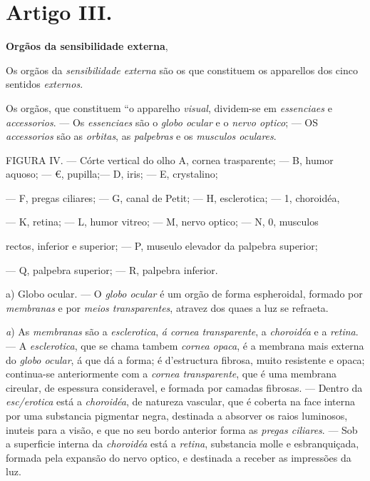 
\section*{Artigo III.}

\textbf{Orgãos da sensibilidade externa},


Os orgãos da \emph{sensibilidade externa} são os que constituem os apparellos dos cinco sentidos \emph{externos}.


 
Os orgãos, que constituem “o apparelho \emph{visual}, dividem-se em \emph{essenciaes} e \emph{accessorios}. --- Os \emph{essenciaes} são o \emph{globo ocular} e o \emph{nervo optico}; --- OS \emph{accessorios} são as \emph{orbitas}, as \emph{palpebras} e os \emph{musculos oculares}.

FIGURA IV. --- Córte vertical do olho A, cornea trasparente; --- B, humor aquoso; --- €, pupilla;--- D, iris; --- E, crystalino;

--- F, pregas ciliares; --- G, canal de Petit; --- H, esclerotica; --- 1, choroidéa,

--- K, retina; --- L, humor vitreo; --- M, nervo optico; --- N, 0, musculos

rectos, inferior e superior; --- P, museulo elevador da palpebra superior;

--- Q, palpebra superior; --- R, palpebra inferior.

a) Globo ocular. --- O \emph{globo ocular} é um orgão de forma espheroidal, formado por \emph{membranas} e por \emph{meios transparentes}, atravez dos quaes a luz se refraeta.

\emph{a}) As \emph{membranas} são a \emph{esclerotica}, \emph{á cornea transparente}, a \emph{choroidéa} e a \emph{retina}. --- A \emph{esclerotica}, que se chama tambem \emph{cornea opaca}, é a membrana mais externa do \emph{globo ocular}, á que dá a forma; é d'estructura fibrosa, muito resistente e opaca; continua-se anteriormente com a \emph{cornea transparente}, que é uma membrana cireular, de espessura consideravel, e formada por camadas fibrosas. --- Dentro da \emph{esc/erotica} está a   \emph{choroidéa}, de natureza vascular, que é coberta na face interna por uma substancia pigmentar negra, destinada a absorver os raios luminosos, inuteis para a visão, e que no seu bordo anterior forma as \emph{pregas ciliares}. --- Sob a superficie interna da \emph{choroidéa} está a \emph{retina}, substancia molle e esbranquiçada, formada pela expansão do nervo optico, e destinada a receber as impressões da luz.

